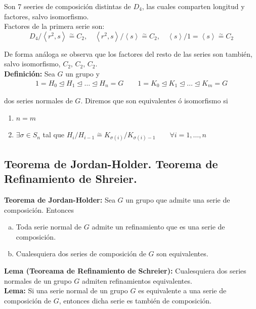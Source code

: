 \documentclass{article}
\begin{document}
Son 7 seeries de composición distintas de $D_4$, las cuales comparten longitud y factores, salvo isomorfismo. \\

Factores de la primera serie son:
\begin{equation*}
D_4/\left\langle r^2,s\right\rangle\overset{\sim}{=} C_2,\quad \left\langle r^2,s\right\rangle/\left\langle s\right\rangle\overset{\sim}{=} C_2,\quad \left\langle s\right\rangle / 1 =\left\langle s\right\rangle \overset{\sim}{=} C_2
\end{equation*}

De forma análoga se observa que los factores del resto de las series son también, salvo isomorfismo, $C_2,\,C_2,\,C_2$. \\

\textbf{Definición:} Sea $G$ un grupo y
\begin{gather*}
1=H_0\unlhd H_1\unlhd \ldots \unlhd H_n=G\qquad
1=K_0\unlhd K_1\unlhd \ldots \unlhd K_m=G
\end{gather*}

dos series normales de $G$. Diremos que son equivalentes ó isomorfismo si 
\begin{enumerate}[\bfseries (i)]
\item $n=m$

\item $\exists \sigma \in S_n$ tal que $H_i/H_{i-1}\overset{\sim}{=}K_{\sigma(i)}/K_{\sigma(i)-1} \qquad \forall i=1,\ldots,n$
\end{enumerate}

\subsection{Teorema de Jordan-Holder. Teorema de Refinamiento de Shreier.}
\textbf{Teorema de Jordan-Holder:} Sea $G$ un grupo que admite una serie de composición. Entonces
\begin{enumerate}[a)]
\item Toda serie normal de $G$ admite un refinamiento que es una serie de composición.

\item Cualesquiera dos series de composición de $G$ son equivalentes.
\end{enumerate}

\textbf{Lema (Teoreama de Refinamiento de Schreier):} Cualesquiera dos series normales de un grupo $G$ admiten refinamientos equivalentes. \\

\textbf{Lema:} Si una serie normal de un grupo $G$ es equivalente a una serie de composición de $G$, entonces dicha serie es también de composición. \\
\end{document}
